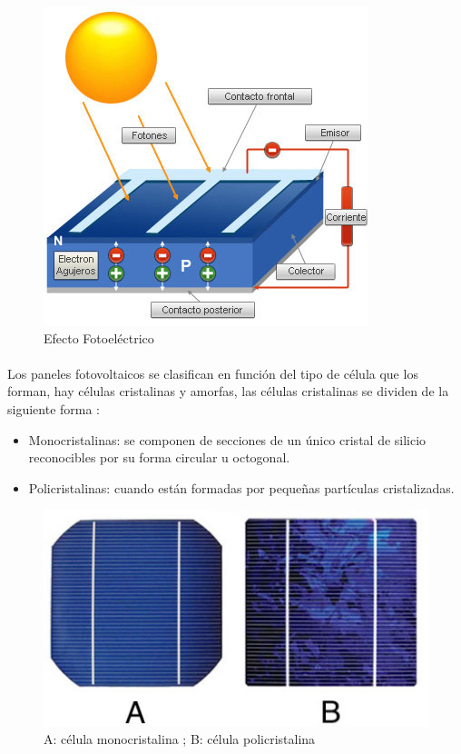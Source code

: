 \begin{figure}[H]
	\centering
	\includegraphics[scale=.50]{Capitulo2/images/celula-fotovoltaica.jpg}
	\caption{Efecto Fotoeléctrico}
	\label{fig:diagrama_dispensador}
\end{figure}

\paragraph{}
Los paneles fotovoltaicos se clasifican en función del tipo de célula que los forman, hay células cristalinas y amorfas, las células cristalinas se dividen de la siguiente forma :

\begin{itemize}
	\item Monocristalinas: se componen de secciones de un único cristal de silicio reconocibles por su forma circular u octogonal.
	\item Policristalinas: cuando están formadas por pequeñas partículas cristalizadas.
\end{itemize}

\begin{figure}[H]
	\centering
	\includegraphics[scale=.50]{Capitulo2/images/tipospaneles.jpg}
	\caption{A: célula monocristalina ; B: célula policristalina}
	\label{fig:diagrama_dispensador}
\end{figure}

